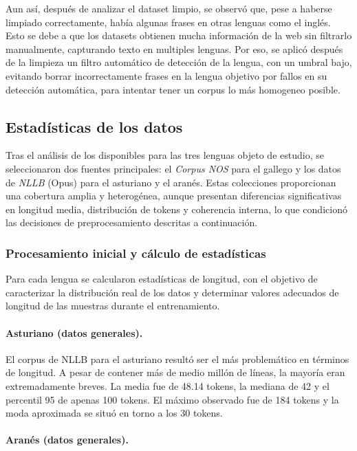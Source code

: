 Aun así, después de analizar el dataset limpio, se observó que, pese a haberse limpiado correctamente, había algunas frases en otras lenguas como el inglés. Esto se debe a que los datasets obtienen mucha información de la web sin filtrarlo manualmente, capturando texto en multiples lenguas. Por eso, se aplicó después de la limpieza un filtro automático de detección de la lengua, con un umbral bajo, evitando borrar incorrectamente frases en la lengua objetivo por fallos en su detección automática, para intentar tener un corpus lo más homogeneo posible.

\subsection{Estadísticas de los datos}
\label{estadisticas-datos}

Tras el análisis de los  disponibles para las tres lenguas objeto de estudio, se seleccionaron dos fuentes principales: el \textit{Corpus NOS} para el gallego y los datos de \textit{NLLB} (Opus) para el asturiano y el aranés. Estas colecciones proporcionan una cobertura amplia y heterogénea, aunque presentan diferencias significativas en longitud media, distribución de tokens y coherencia interna, lo que condicionó las decisiones de preprocesamiento descritas a continuación.

\subsubsection*{Procesamiento inicial y cálculo de estadísticas}

Para cada lengua se calcularon estadísticas de longitud, con el objetivo de caracterizar la distribución real de los datos y determinar valores adecuados de longitud de las muestras durante el entrenamiento. 

\paragraph{Asturiano (datos generales).}

El corpus de NLLB para el asturiano resultó ser el más problemático en términos de longitud. A pesar de contener más de medio millón de líneas, la mayoría eran extremadamente breves. La media fue de 48.14 tokens, la mediana de 42 y el percentil 95 de apenas 100 tokens. El máximo observado fue de 184 tokens y la moda aproximada se situó en torno a los 30 tokens.

\paragraph{Aranés (datos generales).}

